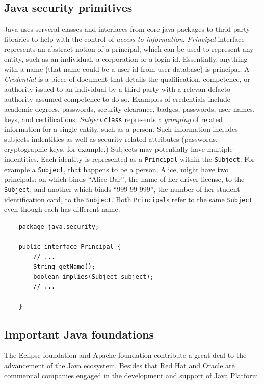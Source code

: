 \documentclass[a4paper]{article}
\begin{document}
\subsection*{Java security primitives}
Java uses serveral classes and interfaces from core java packages to thrid party libraries to help with the control of \emph{access to information}.
\emph{Principal} interface represents an abstract notion of a principal, which can be used to represent any entity, 
such as an individual, a corporation or a login id. Essentially, anything with a name (that name could be a user id from user database) 
is principal. 
A \emph{Credential} is a piece of document that details the qualification, competence, or authority issued to an individual by a third party
with a relevan defacto authority assumed competence to do so. Examples of credentials include academic degrees, passwords,
security clearance, badges, passwords, user names, keys, and certifications. \emph{Subject} \lstinline{class} represents 
a \emph{grouping} of related information for a single entity, such as a person. Such information includes subjects indentities
as well as security related attributes (passwords, cryptographic keys, for example.) Subjects may potentially have multiple
indentities. Each identity is represented as a \lstinline{Principal} within the \lstinline{Subject}. For example a \lstinline{Subject},
that happens to be a person, Alice, might have two principals: on which binds ``Alice Bar'', the name of her driver license,
to the \lstinline{Subject}, and another which binds ``999-99-999'', the number of her student identification card, to the 
\lstinline{Subject}. Both \lstinline{Principal}s refer to the same \lstinline{Subject} even though each has different name. 


\lstset{style=custom-java}
\begin{lstlisting}
    package java.security;

    public interface Principal {
        // ...
        String getName();
        boolean implies(Subject subject);
        // ...

    }
\end{lstlisting}

\subsection*{Important Java foundations}
The Eclipse foundation and Apache foundation contribute a great deal to the advancement of the Java ecosystem.
Besides that Red Hat and Oracle are commercial companies engaged in the development and support of Java Platform.
\end{document}
